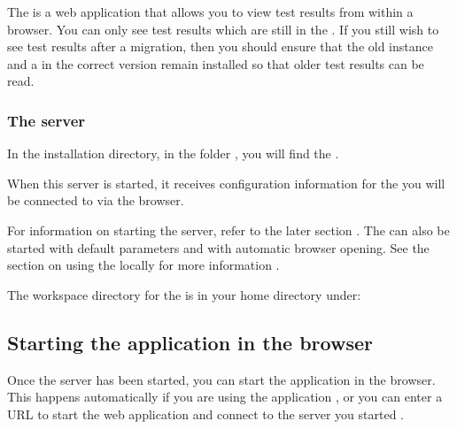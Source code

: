 The \dash{} is a web application that allows you to view test results from within a browser. You can only see test results which are still in the \gddb{} . If you still wish to see test results after a \gddb{} migration, then you should ensure that the old \gddb{} instance and  a \dash{} in the correct version remain installed so that older test results can be read. 

\subsubsection{The \dash{} server}
In the installation directory, in the folder , you will find the . 

When this server is started, it receives configuration information for the 
\gddb{} you will be connected to via the browser. 

For information on starting the server, refer to the later section . The \dash{} can also be started with default parameters and with automatic browser opening. See the section on using the \dash{} locally for more information .

The workspace directory for the \dash{} is in your home directory under:\\

\subsection{Starting the \dash{} application in the browser}
Once the \dash{} server has been started, you can start the \dash{} application in the browser. This happens automatically if you are using the  application , or you can enter a URL to start the web application and connect to the server you started . 
